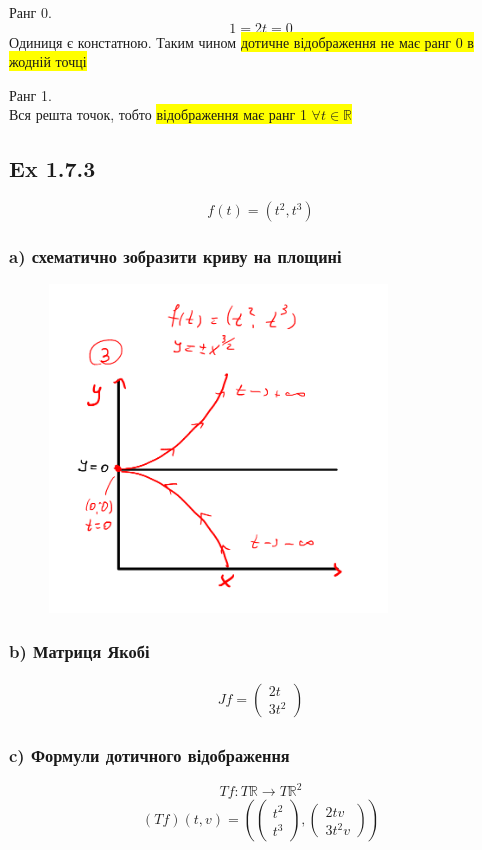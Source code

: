 \documentclass[10pt, a4paper]{article} %
\newcommand{\R}{\mathbb{R}}
\begin{document}
Ранг 0.
\[1 = 2t = 0\]
Одиниця є констатною.
Таким чином \colorbox{yellow}{дотичне відображення не має ранг 0 в жодній точці}

Ранг 1.\\
Вся решта точок, тобто \colorbox{yellow}{відображення має ранг 1 $\forall t \in \R$}


\subsection*{Ex 1.7.3}
\[f(t) = (t^2, t^3)\]

\subsubsection*{a) схематично зобразити криву на площині}
\begin{figure}[h]
    \includegraphics[width=0.8\textwidth]{1.7.3.png}
    \centering
\end{figure}


\subsubsection*{b) Матриця Якобі}
\begin{align*}
    Jf = \begin{pmatrix}
        2t \\ 3t^2
    \end{pmatrix}
\end{align*}

\subsubsection*{c) Формули дотичного відображення}
\[Tf : T\R \to T\R^2\]
\begin{align*}
    (Tf)(t, v) = \left(\begin{pmatrix}
        t^2 \\ t^3
    \end{pmatrix}, \begin{pmatrix}
        2tv \\ 3t^2v
    \end{pmatrix}\right)
\end{align*}
\end{document}
